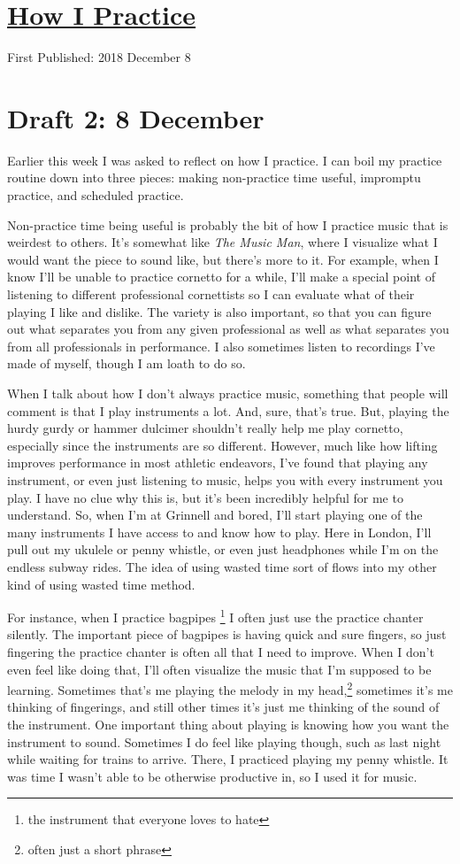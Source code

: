 \documentclass[12pt]{article}[titlepage]
\newcommand{\1}{\={a}}
\newcommand{\2}{\={e}}
\newcommand{\3}{\={\i}}
\newcommand{\4}{\=o}
\newcommand{\5}{\=u}
\newcommand{\6}{\={A}}
\renewcommand{\,}{\textsuperscript{,}}
\begin{document}
\doublespacing
\section{\href{how-i-practice.html}{How I Practice}}
First Published: 2018 December 8
\section{Draft 2: 8 December}
Earlier this week I was asked to reflect on how I practice.
I can boil my practice routine down into three pieces: making non-practice time useful, impromptu practice, and scheduled practice.

Non-practice time being useful is probably the bit of how I practice music that is weirdest to others.
It's somewhat like \textit{The Music Man}, where I visualize what I would want the piece to sound like, but there's more to it.
For example, when I know I'll be unable to practice cornetto for a while, I'll make a special point of listening to different professional cornettists so I can evaluate what of their playing I like and dislike.
The variety is also important, so that you can figure out what separates you from any given professional as well as what separates you from all professionals in performance.
I also sometimes listen to recordings I've made of myself, though I am loath to do so.

When I talk about how I don't always practice music, something that people will comment is that I play instruments a lot.
And, sure, that's true.
But, playing the hurdy gurdy or hammer dulcimer shouldn't really help me play cornetto, especially since the instruments are so different.
However, much like how lifting improves performance in most athletic endeavors, I've found that playing any instrument, or even just listening to music, helps you with every instrument you play.
I have no clue why this is, but it's been incredibly helpful for me to understand.
So, when I'm at Grinnell and bored, I'll start playing one of the many instruments I have access to and know how to play.
Here in London, I'll pull out my ukulele or penny whistle, or even just headphones while I'm on the endless subway rides.
The idea of using wasted time sort of flows into my other kind of using wasted time method.

For instance, when I practice bagpipes \footnote{the instrument that everyone loves to hate} I often just use the practice chanter silently.
The important piece of bagpipes is having quick and sure fingers, so just fingering the practice chanter is often all that I need to improve.
When I don't even feel like doing that, I'll often visualize the music that I'm supposed to be learning.
Sometimes that's me playing the melody in my head,\footnote{often just a short phrase} sometimes it's me thinking of fingerings, and still other times it's just me thinking of the sound of the instrument.
One important thing about playing is knowing how you want the instrument to sound.
Sometimes I do feel like playing though, such as last night while waiting for trains to arrive.
There, I practiced playing my penny whistle.
It was time I wasn't able to be otherwise productive in, so I used it for music.
\end{document}
